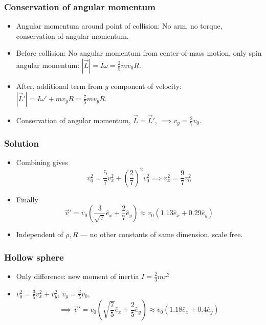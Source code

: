 \documentclass[aspectratio=169]{beamer}
\begin{document}
    \begin{frame}
        \frametitle{Conservation of angular momentum}
        \begin{itemize}
            \item Angular momentum around point of collision: No arm, no torque, conservation of angular momentum.
            \item Before collision: No angular momentum from center-of-mass motion, only spin angular momentum:
            $|\vec L| = I \omega = \frac{2}{5} m v_0 R $.
            \item After, additional term from $y$ component of velocity: 
            $|\vec  L'| = I \omega' + mv_y R = \frac{7}{5} m v_y R$.
            \item Conservation of angular momentum, $\vec L = \vec L'$,
            $
                \implies v_y = \frac{2}{7} v_0.
            $
        \end{itemize}
    \end{frame}

    \begin{frame}
        \frametitle{Solution}
        
        \begin{itemize}
            \item Combining gives
            $$
                v_0^2 = \frac{5}{7} v_x^2 + \left(\frac{2}{7}\right)^2 v_0^2
                \implies v_x^2 = \frac{9}{7} v_0^2
            $$
            \item Finally 
            $$
                \vec v' = v_0 \left( \frac{3}{\sqrt 7}\hat e_x + \frac{2}{7} \hat e_y\right)
                \approx v_0(1.13 \hat e_x + 0.29 \hat e_y)
            $$
            \item Independent of $\rho, R$ --- no other constants of same dimension, scale free.
        \end{itemize}
    \end{frame}

    \begin{frame}
        \frametitle{Hollow sphere}
        
        \begin{itemize}
            \item Only difference: new moment of inertia $I = \frac{2}{3} m r^2$
            \item $v_0^2 = \frac{3}{5}v_x^2 + v_y^2$, $v_y = \frac{2}{5}v_0$, \\
            $$
                \implies \vec v' = v_0 \left(  \sqrt{\frac{7}{5}} \hat e_x + \frac{2}{5} \hat e_y\right)
                \approx v_0(1.18 \hat e_x + 0.4 \hat e_y)
            $$
        \end{itemize}
    \end{frame}
\end{document}
